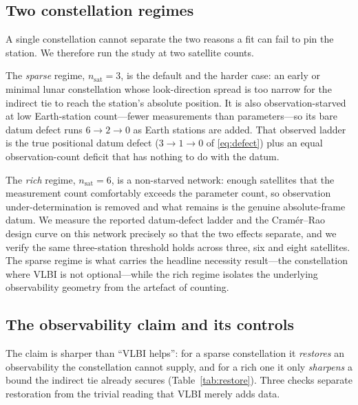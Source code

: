 \subsection{Two constellation regimes}

A single constellation cannot separate the two reasons a fit can fail to pin the
station. We therefore run the study at two satellite counts.

The \emph{sparse} regime, $n_{\mathrm{sat}} = 3$, is the default and the harder
case: an early or minimal lunar constellation whose look-direction spread is too
narrow for the indirect tie to reach the station's absolute position. It is also
observation-starved at low Earth-station count---fewer measurements than
parameters---so its bare datum defect runs $6 \to 2 \to 0$ as Earth stations are
added. That observed ladder is the true positional datum defect ($3 \to 1 \to 0$
of \eqref{eq:defect}) plus an equal observation-count deficit that has nothing to
do with the datum.

The \emph{rich} regime, $n_{\mathrm{sat}} = 6$, is a non-starved network: enough
satellites that the measurement count comfortably exceeds the parameter count, so
observation under-determination is removed and what remains is the genuine
absolute-frame datum. We measure the reported datum-defect ladder and the
Cram\'er--Rao design curve on this network precisely so that the two effects
separate, and we verify the same three-station threshold holds across three, six
and eight satellites. The sparse regime is what carries the headline necessity
result---the constellation where VLBI is not optional---while the rich regime
isolates the underlying observability geometry from the artefact of counting.

\subsection{The observability claim and its controls}

The claim is sharper than ``VLBI helps'': for a sparse constellation it
\emph{restores} an observability the constellation cannot supply, and for a rich
one it only \emph{sharpens} a bound the indirect tie already secures
(Table~\ref{tab:restore}). Three checks separate restoration from the trivial
reading that VLBI merely adds data.

